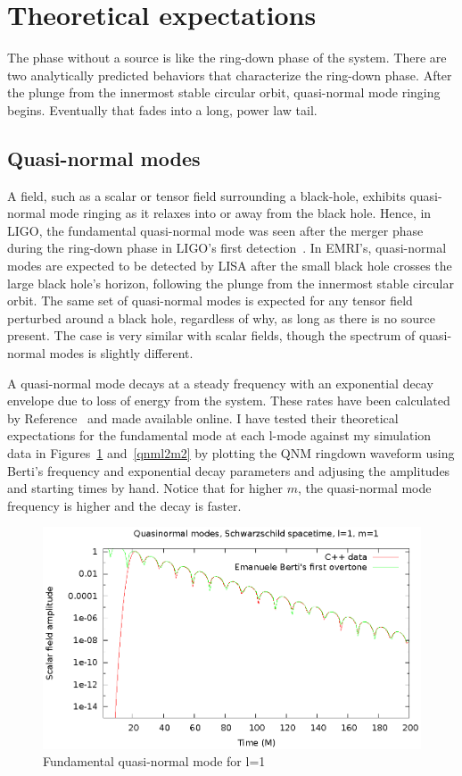   



\section{Theoretical expectations}

The phase without a source is like the ring-down phase of the system. There are two analytically predicted behaviors that characterize the ring-down phase. After the plunge from the innermost stable circular orbit, quasi-normal mode ringing begins. Eventually that fades into a long, power law tail.

\subsection{Quasi-normal modes}
A field, such as a scalar or tensor field surrounding a black-hole, exhibits quasi-normal mode ringing as it relaxes into or away from the black hole.  Hence, in LIGO, the fundamental quasi-normal mode was seen after the merger phase during the ring-down phase in LIGO's first detection~\cite{LIGO1e}. In EMRI's, quasi-normal modes are expected to be detected by LISA after the small black hole crosses the large black hole's horizon, following the plunge from the innermost stable circular orbit. The same set of quasi-normal modes is expected for any tensor field perturbed around a black hole, regardless of why, as long as there is no source present. The case is very similar with scalar fields, though the spectrum of quasi-normal modes is slightly different.

A quasi-normal mode decays at a steady frequency with an exponential decay envelope due to loss of energy from the system. These rates have been calculated by Reference~\cite{bertiSchwQNM} and made available online. I have tested their theoretical expectations for the fundamental mode at each l-mode against my simulation data in Figures~\ref{qnml1m1} and~\ref{qnml2m2} by plotting the QNM ringdown waveform using Berti's frequency and exponential decay parameters and adjusing the amplitudes and starting times by hand. Notice that for higher $m$, the quasi-normal mode frequency is higher and the decay is faster.

\begin{figure}
  \includegraphics{l1m1qnm}
  \caption{Fundamental quasi-normal mode for l=1}
  \label{qnml1m1}
\end{figure}

